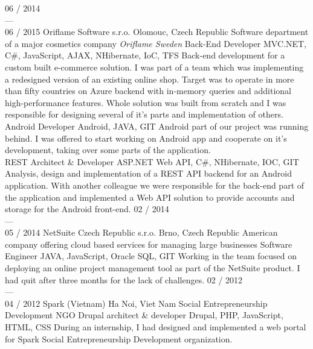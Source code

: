 \documentclass[]{friggeri-cv} %
\begin{document}
\begin{entrylist}
  \job
  {06 / 2014 \\ --- \\ 06 / 2015}
  {Oriflame Software s.r.o.}
  {Olomouc, Czech Republic}
  {Software department of a major cosmetics company \emph{Oriflame Sweden}}
  {
    \position
    {Back-End Developer}
    {MVC.NET, C\#, JavaScript, AJAX, NHibernate, IoC, TFS}
    {Back-end development for a custom built e-commerce solution.
    I was part of a team which was implementing a redesigned version of an existing online shop.
    Target was to operate in more than fifty countries on Azure backend with in-memory queries and additional high-performance features.
    Whole solution was built from scratch and I was responsible for designing several of it's parts and implementation of others.}\\
    \position
    {Android Developer}
    {Android, JAVA, GIT}
    {Android part of our project was running behind.
    I was offered to start working on Android app and cooperate on it's development, taking over some parts of the application.}\\
    \position
    {REST Architect \& Developer}
    {ASP.NET Web API, C\#, NHibernate, IOC, GIT}
    {Analysis, design and implementation of a REST API backend for an Android application.
    With another colleague we were responsible for the back-end part of the application and implemented a Web API solution to provide
    accounts and storage for the Android front-end.}%
  }
  \job
  {02 / 2014 \\ --- \\ 05 / 2014}
  {NetSuite Czech Republic s.r.o.}
  {Brno, Czech Republic}
  {American company offering cloud based services for managing large businesses}
  {
    \position
    {Software Engineer}
    {JAVA, JavaScript, Oracle SQL, GIT}
    {Working in the team focused on deploying an online project management tool as part of the NetSuite product.
    I had quit after three months for the lack of challenges.}
  }
  \job
  {02 / 2012 \\ --- \\ 04 / 2012}
  {Spark (Vietnam)}
  {Ha Noi, Viet Nam}
  {Social Entrepreneurship Development NGO}
  {
    \position
    {Drupal architect \& developer}
    {Drupal, PHP, JavaScript, HTML, CSS}
    {During an internship, I had designed and implemented a web portal for Spark Social Entrepreneurship Development organization.}
  }
\end{entrylist}
\end{document}
